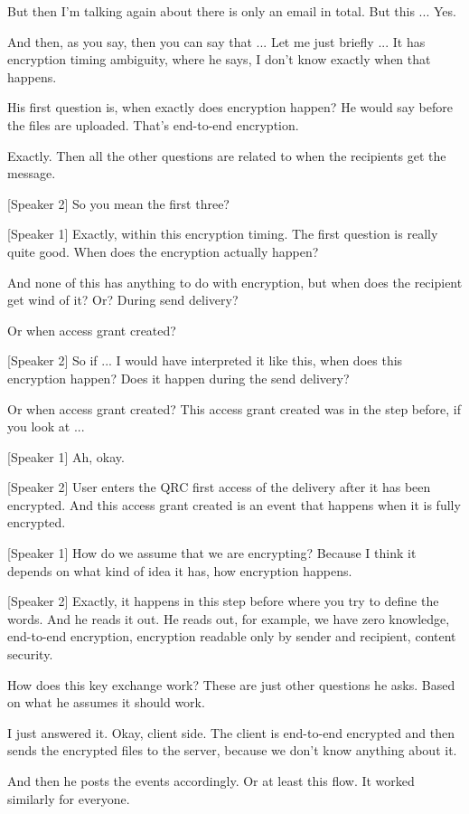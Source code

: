 But then I'm talking again about there is only an email in total. But this ... Yes.

And then, as you say, then you can say that ... Let me just briefly ... It has encryption timing ambiguity, where he says, I don't know exactly when that happens.

His first question is, when exactly does encryption happen? He would say before the files are uploaded. That's end-to-end encryption.

Exactly. Then all the other questions are related to when the recipients get the message.

[Speaker 2]
So you mean the first three?

[Speaker 1]
Exactly, within this encryption timing. The first question is really quite good. When does the encryption actually happen?

And none of this has anything to do with encryption, but when does the recipient get wind of it? Or? During send delivery?

Or when access grant created?

[Speaker 2]
So if ... I would have interpreted it like this, when does this encryption happen? Does it happen during the send delivery?

Or when access grant created? This access grant created was in the step before, if you look at ...

[Speaker 1]
Ah, okay.

[Speaker 2]
User enters the QRC first access of the delivery after it has been encrypted. And this access grant created is an event that happens when it is fully encrypted.

[Speaker 1]
How do we assume that we are encrypting? Because I think it depends on what kind of idea it has, how encryption happens.

[Speaker 2]
Exactly, it happens in this step before where you try to define the words. And he reads it out. He reads out, for example, we have zero knowledge, end-to-end encryption, encryption readable only by sender and recipient, content security.

How does this key exchange work? These are just other questions he asks. Based on what he assumes it should work.

I just answered it. Okay, client side. The client is end-to-end encrypted and then sends the encrypted files to the server, because we don't know anything about it.

And then he posts the events accordingly. Or at least this flow. It worked similarly for everyone.

